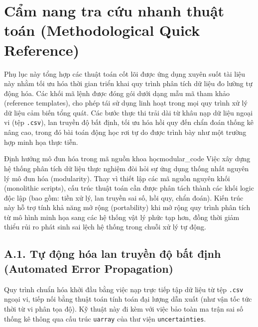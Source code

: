 \chapter{Cẩm nang tra cứu nhanh thuật toán (Methodological Quick Reference)}
\label{app:quick_reference}

Phụ lục này tổng hợp các thuật toán cốt lõi được ứng dụng xuyên suốt tài liệu này nhằm tối ưu hóa thời gian triển khai quy trình phân tích dữ liệu đo lường tự động hóa. Các khối mã lệnh được đóng gói dưới dạng mẫu mã tham khảo (reference templates), cho phép tái sử dụng linh hoạt trong mọi quy trình xử lý dữ liệu cảm biến tổng quát. Các bước thực thi trải dài từ khâu nạp dữ liệu ngoại vi (tệp \texttt{.csv}), lan truyền độ bất định, tối ưu hóa hồi quy đến chẩn đoán thống kê nâng cao, trong đó bài toán động học rơi tự do được trình bày như một trường hợp minh họa thực tiễn.

\begin{physcore}{Định hướng mô đun hóa trong mã nguồn khoa học}{modular_code}
Việc xây dựng hệ thống phân tích dữ liệu thực nghiệm đòi hỏi sự ứng dụng thống nhất nguyên lý mô đun hóa (modularity). Thay vì thiết lập các mã nguồn nguyên khối (monolithic scripts), cấu trúc thuật toán cần được phân tách thành các khối logic độc lập (bao gồm: tiền xử lý, lan truyền sai số, hồi quy, chẩn đoán). Kiến trúc này hỗ trợ tính khả năng mở rộng (portability) khi mở rộng quy trình phân tích từ mô hình minh họa sang các hệ thống vật lý phức tạp hơn, đồng thời giảm thiểu rủi ro phát sinh sai lệch hệ thống trong chuỗi xử lý tự động.
\end{physcore}

\section*{A.1. Tự động hóa lan truyền độ bất định (Automated Error Propagation)}

Quy trình chuẩn hóa khởi đầu bằng việc nạp trực tiếp tập dữ liệu từ tệp \texttt{.csv} ngoại vi, tiếp nối bằng thuật toán tính toán đại lượng dẫn xuất (như vận tốc tức thời từ vi phân tọa độ). Kỹ thuật này đi kèm với việc bảo toàn ma trận sai số thống kê thông qua cấu trúc \texttt{uarray} của thư viện \texttt{uncertainties}.


